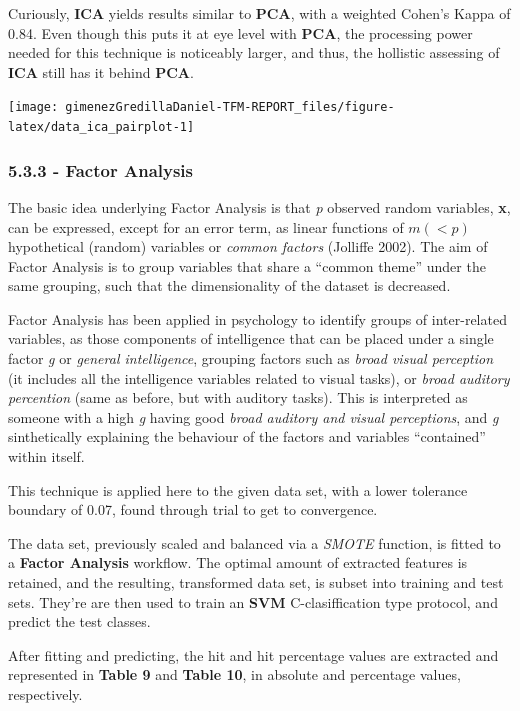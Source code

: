 \documentclass[]{article}
\begin{document}
Curiously, \textbf{ICA} yields results similar to \textbf{PCA}, with a
weighted Cohen's Kappa of 0.84. Even though this puts it at eye level
with \textbf{PCA}, the processing power needed for this technique is
noticeably larger, and thus, the hollistic assessing of \textbf{ICA}
still has it behind \textbf{PCA}.

\texttt{[image: gimenezGredillaDaniel-TFM-REPORT\_files/figure-latex/data\_ica\_pairplot-1]}

\subsubsection{5.3.3 - Factor Analysis}\label{factor-analysis-1}

The basic idea underlying Factor Analysis is that \emph{p} observed
random variables, \textbf{x}, can be expressed, except for an error
term, as linear functions of \(m(<p)\) hypothetical (random) variables
or \emph{common factors} (Jolliffe 2002). The aim of Factor Analysis is
to group variables that share a ``common theme'' under the same
grouping, such that the dimensionality of the dataset is decreased.

Factor Analysis has been applied in psychology to identify groups of
inter-related variables, as those components of intelligence that can be
placed under a single factor \emph{g} or \emph{general intelligence},
grouping factors such as \emph{broad visual perception} (it includes all
the intelligence variables related to visual tasks), or \emph{broad
auditory percention} (same as before, but with auditory tasks). This is
interpreted as someone with a high \emph{g} having good \emph{broad
auditory and visual perceptions}, and \emph{g} sinthetically explaining
the behaviour of the factors and variables ``contained'' within itself.

This technique is applied here to the given data set, with a lower
tolerance boundary of 0.07, found through trial to get to convergence.

The data set, previously scaled and balanced via a \emph{SMOTE}
function, is fitted to a \textbf{Factor Analysis} workflow. The optimal
amount of extracted features is retained, and the resulting, transformed
data set, is subset into training and test sets. They're are then used
to train an \textbf{SVM} C-clasiffication type protocol, and predict the
test classes.

After fitting and predicting, the hit and hit percentage values are
extracted and represented in \textbf{Table 9} and \textbf{Table 10}, in
absolute and percentage values, respectively.
\end{document}
